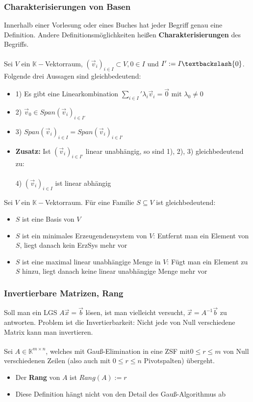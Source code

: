 \documentclass[titlepage]{article}
\newcommand{\K}{\mathbb{K}}
\newcommand{\1}{\mathbb{1}}
\newcommand{\0}{\mathbb{0}}
\begin{document}
				\subsubsection{Charakterisierungen von Basen}	
					Innerhalb einer Vorlesung oder eines Buches hat jeder Begriff genau eine Definition. Andere Definitionsmöglichkeiten heißen \textbf{Charakterisierungen} des Begriffs.\\\\
					Sei $V$ ein $\K-$Vektorraum, $(\vec{v}_i)_{i\in I}\subset V,0\in I$ und $I':=I\textbackslash\{0\}$. Folgende drei Aussagen sind gleichbedeutend:					\begin{itemize}
						\item 1) Es gibt eine Linearkombination $\sum\limits_{i\in I}\text{$'$}\lambda_i\vec{v}_i=\vec{0}$ mit $\lambda_0\neq0$
						\item 2) $\vec{v}_0\in Span(\vec{v}_i)_{i\in I'}$
						\item 3) $Span(\vec{v}_i)_{i\in I}=Span(\vec{v}_i)_{i\in I'}$
						\item \textbf{Zusatz:} Ist $(\vec{v}_i)_{i\in I'}$ linear unabhängig, so sind 1), 2), 3) gleichbedeutend zu:\\\\
						4) $(\vec{v}_i)_{i\in I}$ ist linear abhängig
					\end{itemize}
					Sei $V$ ein $\K-$Vektorraum. Für eine Familie $S\subseteq V$ ist gleichbedeutend:
					\begin{itemize}
						\item $S$ ist eine Basis von $V$
						\item $S$ ist ein minimales Erzeugendensystem von $V$: Entfernt man ein Element von $S$, liegt danach kein ErzSys mehr vor
						\item $S$ ist eine maximal linear unabhängige Menge in $V$: Fügt man ein Element zu $S$ hinzu, liegt danach keine linear unabhängige Menge mehr vor
					\end{itemize}
				\subsubsection{Invertierbare Matrizen, Rang}
					Soll man ein LGS $A\vec{x}=\vec{b}$ lösen, ist man vielleicht versucht, $\vec{x}=A^{-1}\vec{b}$ zu  antworten. Problem ist die Invertierbarkeit: Nicht jede von Null verschiedene Matrix kann man invertieren.\\\\
					Sei $A\in\K^{m\times n}$, welches mit Gauß-Elimination in eine ZSF mit$0\le r\le m$ von Null verschiedenen Zeilen (also auch mit $0\le r\le n$ Pivotspalten) übergeht.
					\begin{itemize}
						\item Der \textbf{Rang} von $A$ ist $Rang(A):=r$
						\item Diese Definition hängt nicht von den Detail des Gauß-Algorithmus ab
					\end{itemize}
\end{document}

